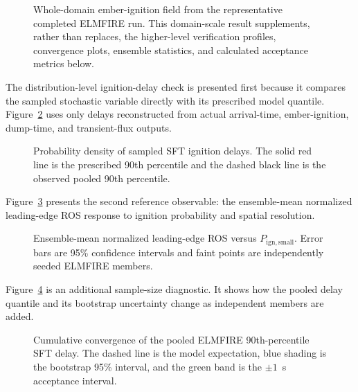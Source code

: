 \begin{figure}[H]
\centering
{}
\caption{Whole-domain ember-ignition field from the representative completed ELMFIRE run.  This
domain-scale result supplements, rather than replaces, the higher-level verification
profiles, convergence plots, ensemble statistics, and calculated acceptance metrics below.}
\label{fig:domain-result}
\end{figure}


The distribution-level ignition-delay check is presented first because it
compares the sampled stochastic variable directly with its prescribed model
quantile. Figure~\ref{fig:delay-distribution} uses only delays reconstructed
from actual arrival-time, ember-ignition, dump-time, and transient-flux outputs.

\begin{figure}[H]
\centering
{}
\caption{Probability density of sampled SFT ignition delays. The solid red line
is the prescribed 90th percentile and the dashed black line is the observed
pooled 90th percentile.}
\label{fig:delay-distribution}
\end{figure}

Figure~\ref{fig:response} presents the second reference observable: the
ensemble-mean normalized leading-edge ROS response to ignition probability and
spatial resolution.

\begin{figure}[H]
\centering
{}
\caption{Ensemble-mean normalized leading-edge ROS versus
$P_{\mathrm{ign,small}}$. Error bars are 95\% confidence intervals and faint
points are independently seeded ELMFIRE members.}
\label{fig:response}
\end{figure}

Figure~\ref{fig:delay} is an additional sample-size diagnostic. It shows how
the pooled delay quantile and its bootstrap uncertainty change as independent
members are added.

\begin{figure}[H]
\centering
{}
\caption{Cumulative convergence of the pooled ELMFIRE 90th-percentile SFT
delay. The dashed line is the model expectation, blue shading is the bootstrap
95\% interval, and the green band is the $\pm1$~s acceptance interval.}
\label{fig:delay}
\end{figure}

